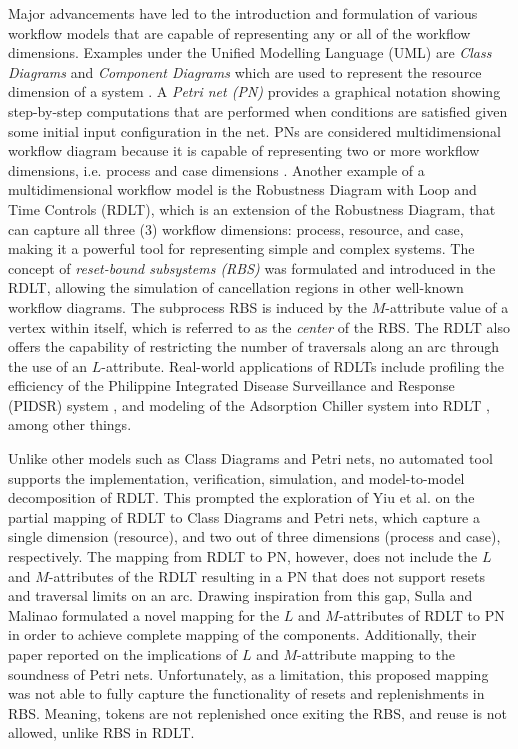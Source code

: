 Major advancements have led to the introduction and formulation of various workflow models that are capable of representing any or all of the workflow dimensions. Examples under the Unified Modelling Language (UML) are \textit{Class Diagrams} and \textit{Component Diagrams} which are used to represent the resource dimension of a system \cite{uml}. A \textit{Petri net (PN)} provides a graphical notation showing step-by-step computations that are performed when conditions are satisfied given some initial input configuration in the net. PNs are considered multidimensional workflow diagram because it is capable of representing two or more workflow dimensions, i.e. process and case dimensions \cite{yiu}. Another example of a multidimensional workflow model is the Robustness Diagram with Loop and Time Controls (RDLT), which is an extension of the Robustness Diagram, that can capture all three (3) workflow dimensions: process, resource, and case, making it a powerful tool for representing simple and complex systems. The concept of \textit{reset-bound subsystems (RBS)} was formulated and introduced in the RDLT, allowing the simulation of cancellation regions in other well-known workflow diagrams. The subprocess RBS is induced by the $M$-attribute value of a vertex within itself, which is referred to as the \textit{center} of the RBS. The RDLT also offers the capability of restricting the number of traversals along an arc through the use of an $L$-attribute. Real-world applications of RDLTs include profiling the efficiency of the Philippine Integrated Disease Surveillance and Response (PIDSR) system \cite{lopez-etal}, and modeling of the Adsorption Chiller system into RDLT \cite{malinao-rdlt}, among other things. \par

Unlike other models such as Class Diagrams and Petri nets, no automated tool supports the implementation, verification, simulation, and model-to-model decomposition of RDLT. This prompted the exploration of Yiu et al. \cite{yiu} on the partial mapping of RDLT to Class Diagrams and Petri nets, which capture a single dimension (resource), and two out of three dimensions (process and case), respectively. The mapping from RDLT to PN, however, does not include the $L$ and $M$-attributes of the RDLT resulting in a PN that does not support resets and traversal limits on an arc. Drawing inspiration from this gap, Sulla and Malinao \cite{sulla-malinao} formulated a novel mapping for the $L$ and $M$-attributes of RDLT to PN in order to achieve complete mapping of the components. Additionally, their paper reported on the implications of $L$ and $M$-attribute mapping to the soundness of Petri nets. Unfortunately, as a limitation, this proposed mapping was not able to fully capture the functionality of resets and replenishments in RBS. Meaning, tokens are not replenished once exiting the RBS, and reuse is not allowed, unlike RBS in RDLT. \par

